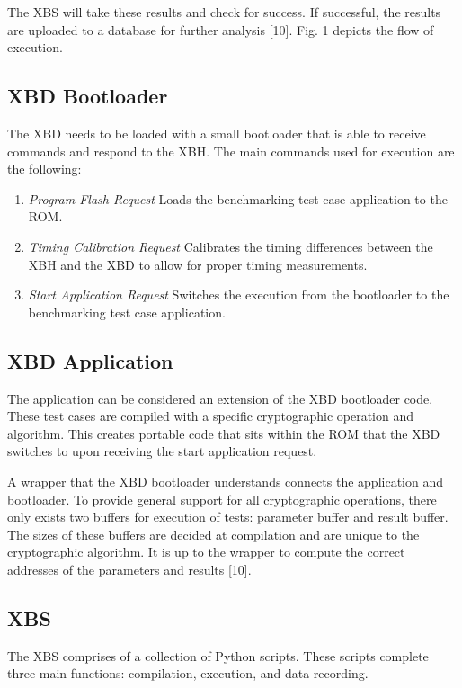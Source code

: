 \documentclass[10pt]{article}
\begin{document}
The XBS will take these results and check for success. If successful, the results are 
uploaded to a database for further analysis [10]. Fig. 1 depicts the flow of execution.

\subsection{XBD Bootloader}
The XBD needs to be loaded with a small bootloader that is able to receive commands 
and respond to the XBH. The main commands used for execution are the following:

\begin{enumerate}
  \item\emph{Program Flash Request}
     Loads the benchmarking test case application to the ROM.
  \item\emph{Timing Calibration Request}
     Calibrates the timing differences between the XBH and the XBD to allow for proper 
     timing measurements.
  \item\emph{Start Application Request}
     Switches the execution from the bootloader to the benchmarking test case application.
\end{enumerate}

\subsection{XBD Application}
The application can be considered an extension of the XBD bootloader code. These test 
cases are compiled with a specific cryptographic operation and algorithm. This creates 
portable code that sits within the ROM that the XBD switches to upon receiving the start 
application request.

A wrapper that the XBD bootloader understands connects the application and bootloader. 
To provide general support for all cryptographic operations, there only exists two buffers 
for execution of tests: parameter buffer and result buffer. The sizes of these buffers 
are decided at compilation and are unique to the cryptographic algorithm. It is up to the 
wrapper to compute the correct addresses of the parameters and results [10].

\subsection{XBS}
The XBS comprises of a collection of Python scripts. These scripts complete three main 
functions: compilation, execution, and data recording. 
\end{document}
